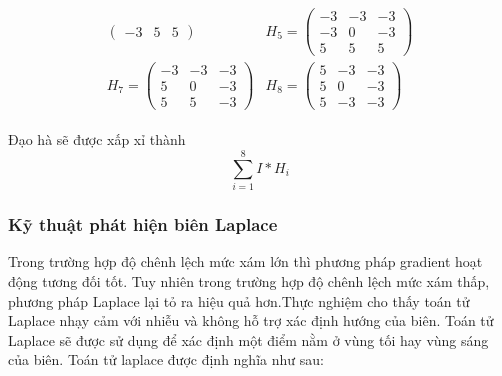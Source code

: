 \documentclass[14pt,oneside,a4paper]{extreport}
\begin{document}
\begin{itemize}
\begin{align*}
\begin{matrix}
\begin{pmatrix}
        -3 & 5 & 5
    \end{pmatrix} & H_5=\begin{pmatrix}
        -3 & -3 & -3 \\
        -3 & 0 & -3  \\
        5 & 5 & 5
    \end{pmatrix}\\
        H_7=\begin{pmatrix}
        -3 & -3 & -3 \\
        5 & 0 & -3  \\
        5 & 5 & -3
    \end{pmatrix} & H_8=\begin{pmatrix}
        5 & -3 & -3 \\
        5 & 0 & -3  \\
        5 & -3 & -3
    \end{pmatrix}
    \end{matrix}
\end{align*}
\end{itemize}
Đạo hà sẽ được xấp xỉ thành $$\sum_{i=1}^{8} I\ast H_i$$
\subsubsection{Kỹ thuật phát hiện biên Laplace }
Trong trường hợp độ chênh lệch mức xám lớn thì phương pháp gradient hoạt động tương đối tốt. Tuy nhiên trong trường hợp độ chênh lệch mức xám thấp, phương pháp Laplace lại tỏ ra hiệu quả hơn.Thực nghiệm cho thấy toán tử Laplace nhạy cảm với nhiễu và không hỗ trợ xác định hướng của biên. Toán tử Laplace sẽ được sử dụng để xác định một điểm nằm ở vùng tối hay vùng sáng của biên. Toán tử laplace được định nghĩa như sau:
\end{document}
